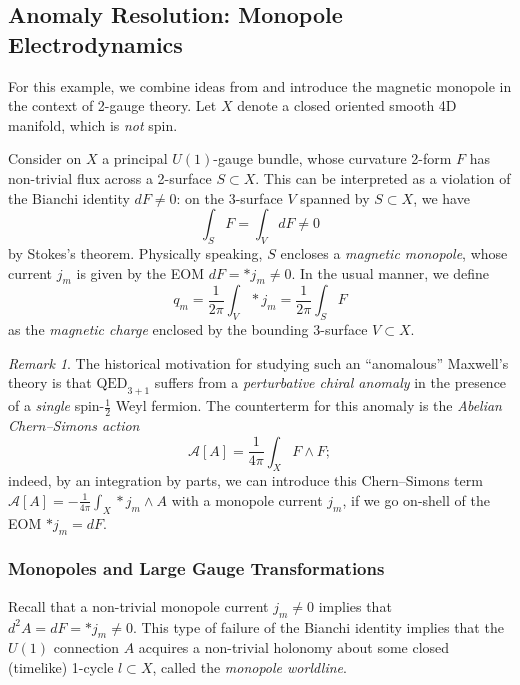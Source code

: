 \documentclass[onecolumn]{article}
\theoremstyle{theorem}
\theoremstyle{remark}
\newtheorem{remark}{Remark}[section]
\theoremstyle{example}
\theoremstyle{definition}
\numberwithin{equation}{section}
\begin{document}
\subsection{Anomaly Resolution: Monopole Electrodynamics} \label{QED-anom} %
For this example, we combine ideas from \cite{Cordova:2018cvg,Benini_2019,Dubinkin:2020kxo} and introduce the magnetic monopole in the context of 2-gauge theory. Let $X$ denote a closed oriented smooth 4D manifold, which is {\it {not}} spin. 

Consider on $X$ a principal $U(1)$-gauge bundle, whose curvature 2-form $F$ has non-trivial flux across a 2-surface $S\subset X$. This can be interpreted as a violation of the Bianchi identity $dF\neq 0$: on the 3-surface $V$ spanned by $S\subset X$, we have
\begin{equation}
    \int_S F = \int_{V} dF \neq 0 \nonumber
\end{equation}
by Stokes's theorem. Physically speaking, $S$ encloses a \textit{{magnetic monopole}}, whose current $j_m$ is given by the EOM $dF=\ast j_m\neq 0$. In the usual manner, we define
\begin{equation}
    q_m = \frac{1}{2\pi}\int_V \ast j_m = \frac{1}{2\pi}\int_S F\label{monodef}
\end{equation}
as the {\it {magnetic charge}} enclosed by the bounding 3-surface $V\subset X$.

\begin{remark}\label{rmk:qed}
The historical motivation for studying such an ``anomalous'' Maxwell's theory is that $\text{QED}_{3+1}$ suffers from a {\it perturbative chiral anomaly} in the presence of a {\it single} spin-$\frac{1}{2}$ Weyl fermion. The counterterm for this anomaly is the {\it Abelian Chern--Simons action} \cite{adler2004anomalies}
\begin{equation}
    \mathcal{A}[A] = \frac{1}{4\pi}\int_X F\wedge F;\nonumber
\end{equation}
indeed, by an integration by parts, we can introduce this Chern--Simons term $\mathcal{A}[A]=-\frac{1}{4\pi}\int_X \ast j_m \wedge A$ with a monopole current $j_m$, if we go on-shell of the EOM $\ast j_m = dF$. 
\end{remark}

\subsubsection{Monopoles and Large Gauge Transformations} 
Recall that a non-trivial monopole current $j_m\neq 0$ implies that $d^2A=dF =\ast j_m \neq 0$. This type of failure of the Bianchi identity implies that the $U(1)$ connection $A$ acquires a non-trivial holonomy about some closed (timelike) 1-cycle $l\subset X$, called the {\it {monopole worldline}}. 
\end{document}
